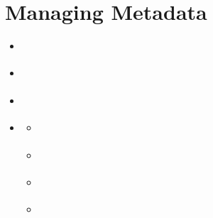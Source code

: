\documentclass[letterpaper,10pt,english]{sphinxmanual}
\begin{document}
\section{Managing Metadata}
\label{\detokenize{en/03_managing_metadata:managing-metadata}}\label{\detokenize{en/03_managing_metadata:metadata-en}}\label{\detokenize{en/03_managing_metadata::doc}}
\begin{sphinxcontents}
\begin{itemize}
\item {} 
\sphinxAtStartPar
{}\label{\detokenize{en/03_managing_metadata:id1}}{\hyperref[\detokenize{en/03_managing_metadata:who-can-edit-metadata}]{}}

\item {} 
\sphinxAtStartPar
{}\label{\detokenize{en/03_managing_metadata:id2}}{\hyperref[\detokenize{en/03_managing_metadata:opening-the-metadata-editor}]{}}

\item {} 
\sphinxAtStartPar
{}\label{\detokenize{en/03_managing_metadata:id3}}{\hyperref[\detokenize{en/03_managing_metadata:overview-of-the-metadata-editor}]{}}

\item {} 
\sphinxAtStartPar
{}\label{\detokenize{en/03_managing_metadata:id4}}{\hyperref[\detokenize{en/03_managing_metadata:editing-key-metadata-fields}]{}}
\begin{itemize}
\item {} 
\sphinxAtStartPar
{}\label{\detokenize{en/03_managing_metadata:id5}}{\hyperref[\detokenize{en/03_managing_metadata:title}]{}}

\item {} 
\sphinxAtStartPar
{}\label{\detokenize{en/03_managing_metadata:id6}}{\hyperref[\detokenize{en/03_managing_metadata:abstract}]{}}

\item {} 
\sphinxAtStartPar
{}\label{\detokenize{en/03_managing_metadata:id7}}{\hyperref[\detokenize{en/03_managing_metadata:keywords}]{}}

\item {} 
\sphinxAtStartPar
{}\label{\detokenize{en/03_managing_metadata:id8}}{\hyperref[\detokenize{en/03_managing_metadata:category}]{}}


\end{itemize}
\end{itemize}
\end{sphinxcontents}
\end{document}
